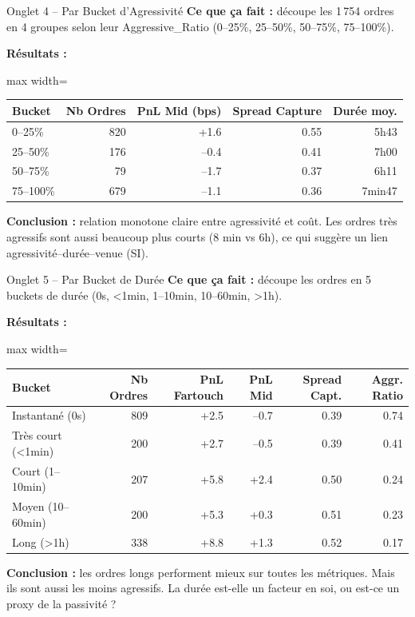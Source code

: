 \documentclass[10pt]{beamer}
\begin{document}
\begin{frame}{Onglet 4 -- Par Bucket d'Agressivité}
\textbf{Ce que ça fait :} découpe les 1\,754 ordres en 4 groupes selon leur Aggressive\_Ratio (0--25\%, 25--50\%, 50--75\%, 75--100\%).

\vspace{0.2cm}
\textbf{Résultats :}

\begin{adjustbox}{max width=\textwidth}
\begin{tabular}{lrrrr}
\toprule
Bucket & Nb Ordres & PnL Mid (bps) & Spread Capture & Durée moy. \\
\midrule
0--25\% & 820 & +1.6 & 0.55 & 5h43 \\
25--50\% & 176 & --0.4 & 0.41 & 7h00 \\
50--75\% & 79 & --1.7 & 0.37 & 6h11 \\
75--100\% & 679 & --1.1 & 0.36 & 7min47 \\
\bottomrule
\end{tabular}
\end{adjustbox}

\vspace{0.3cm}
\textbf{Conclusion :} relation monotone claire entre agressivité et coût. Les ordres très agressifs sont aussi beaucoup plus courts (8 min vs 6h), ce qui suggère un lien agressivité--durée--venue (SI).
\end{frame}

\begin{frame}{Onglet 5 -- Par Bucket de Durée}
\textbf{Ce que ça fait :} découpe les ordres en 5 buckets de durée (0s, <1min, 1--10min, 10--60min, >1h).

\vspace{0.2cm}
\textbf{Résultats :}

\begin{adjustbox}{max width=\textwidth}
\begin{tabular}{lrrrrr}
\toprule
Bucket & Nb Ordres & PnL Fartouch & PnL Mid & Spread Capt. & Aggr. Ratio \\
\midrule
Instantané (0s) & 809 & +2.5 & --0.7 & 0.39 & 0.74 \\
Très court (<1min) & 200 & +2.7 & --0.5 & 0.39 & 0.41 \\
Court (1--10min) & 207 & +5.8 & +2.4 & 0.50 & 0.24 \\
Moyen (10--60min) & 200 & +5.3 & +0.3 & 0.51 & 0.23 \\
Long (>1h) & 338 & +8.8 & +1.3 & 0.52 & 0.17 \\
\bottomrule
\end{tabular}
\end{adjustbox}

\vspace{0.3cm}
\textbf{Conclusion :} les ordres longs performent mieux sur toutes les métriques. Mais ils sont aussi les moins agressifs. La durée est-elle un facteur en soi, ou est-ce un proxy de la passivité ?
\end{frame}
\end{document}
